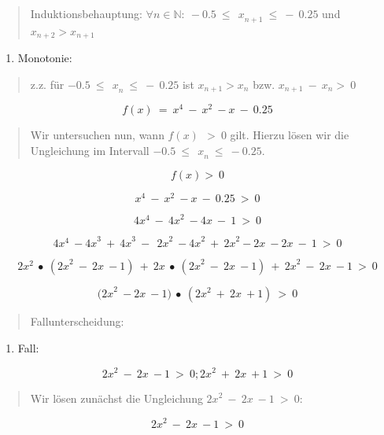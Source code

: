 \documentclass[a4paper, 12pt]{book}
\begin{document}
\begin{longtable}[]
\begin{minipage}[b]{\linewidth}
\begin{quote}
Induktionsbehauptung:
\(\forall n \in \mathbb{N:\ } - 0.5\ {\leq \ \ x}_{n + 1}\  \leq \  - \ 0.25\)
und \(x_{n + 2} > x_{n + 1}\)
\end{quote}

\begin{enumerate}
\def\labelenumi{\arabic{enumi})}
\item
  Monotonie:
\end{enumerate}

\begin{quote}
z.z. für \(- 0.5\ {\leq \ \ x}_{n}\  \leq \  - \ 0.25\) ist
\(x_{n + 1} > x_{n}\) bzw. \(x_{n + 1}\  - {\ x}_{n} > \ 0\)
\end{quote}

\[f(x)\  = \ x^{4}\  - \ x^{2}\  - x\  - \ 0.25\]

\begin{quote}
Wir untersuchen nun, wann \(f(x)\ \  > \ 0\) gilt. Hierzu lösen wir die
Ungleichung im Intervall \(- 0.5\ {\leq \ \ x}_{n}\  \leq \  - 0.25\).
\end{quote}

\[f(x) > \ 0\]

\[x^{4}\  - \ x^{2}\  - x\  - \ 0.25\  > \ 0\]

\[4x^{4}\  - \ {4x}^{2}\  - 4x\  - \ 1\  > \ 0\]

\[4x^{4}\  - {4x}^{3}\  + \ {4x}^{3}\  - \ \ {2x}^{2}\  - {4x}^{2}\  + \ {2x}^{2} - 2x\  - 2x\  - \ 1\  > \ 0\]

\[2x^{2}\  \bullet \ ({2x}^{2}\  - \ 2x\  - 1)\  + \ 2x\  \bullet \ ({2x}^{2}\  - \ 2x\  - 1)\  + \ {2x}^{2}\  - \ 2x\  - 1\  > \ 0\]

\[{(2x}^{2}\  - 2x\  - 1)\  \bullet \ ({2x}^{2}\  + \ 2x\  + 1)\  > \ 0\]

\begin{quote}
Fallunterscheidung:
\end{quote}

\begin{enumerate}
\def\labelenumi{\arabic{enumi}.}
\item
  Fall:
\end{enumerate}

\[{2x}^{2}\  - \ 2x\  - 1\  > \ 0;{2x}^{2}\  + \ 2x\  + 1\  > \ 0\]

\begin{quote}
Wir lösen zunächst die Ungleichung \({2x}^{2}\  - \ 2x\  - 1\  > \ 0\):
\end{quote}

\[{2x}^{2}\  - \ 2x\  - 1\  > \ 0\]


\end{minipage}
\end{longtable}
\end{document}
